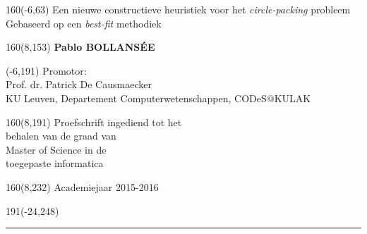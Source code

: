 \documentclass[12pt,a4paper,oneside]{book}
\begin{document}
%
\begin{textblock}{160}(-6,63)
\textblockcolour{}
\vspace{-\parskip}
\flushleft
\fontsize{40}{42}\selectfont \textcolor{bluetitle}{Een nieuwe constructieve heuristiek voor het \textit{circle-packing} probleem}\\[1.5mm]
\fontsize{20}{22}\selectfont Gebaseerd op een \textit{best-fit} methodiek
\end{textblock}
%
\begin{textblock}{160}(8,153)
\textblockcolour{}
\vspace{-\parskip}
\flushright
\fontsize{14}{16}\selectfont \textbf{Pablo BOLLANSÉE}
\end{textblock}
%
\begin{textblock}{70}(-6,191)
\textblockcolour{}
\vspace{-\parskip}
\flushleft
Promotor:\\ Prof. dr. Patrick De Causmaecker \\[-2pt]
\textcolor{blueaff}{KU Leuven, Departement Computerwetenschappen, CODeS@KULAK}\\[5pt]
\end{textblock}
%
\begin{textblock}{160}(8,191)
\textblockcolour{}
\vspace{-\parskip}
\flushright
Proefschrift ingediend tot het\\[4.5pt]
behalen van de graad van\\[4.5pt]
Master of Science in de\\[4.5pt]
toegepaste informatica\\
\end{textblock}
%
\begin{textblock}{160}(8,232)
\textblockcolour{}
\vspace{-\parskip}
\flushright
Academiejaar 2015-2016
\end{textblock}
%
\begin{textblock}{191}(-24,248)
{\color{blueline}\rule{550pt}{5.5pt}}
\end{textblock}
%
\vfill
\end{document}

